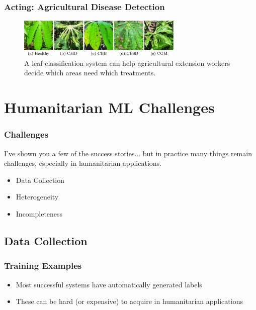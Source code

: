 \documentclass[10pt,mathserif]{beamer}
\begin{document}
\begin{frame}
  \frametitle{Acting: Agricultural Disease Detection}
  \begin{figure}[ht]
    \centering
    \includegraphics[width=0.7\textwidth]{figures/cassava}
    \caption{A leaf classification system can help agricultural extension
      workers decide which areas need which treatments. \label{fig:cassava} }
  \end{figure}

\end{frame}

\section{Humanitarian ML Challenges}
\label{sec:label}

\begin{frame}
  \frametitle{Challenges}

  I've shown you a few of the success stories... but in practice many things
  remain challenges, especially in humanitarian applications.

  \begin{itemize}
  \item Data Collection
  \item Heterogeneity
  \item Incompleteness
  \end{itemize} 
\end{frame}

\subsection{Data Collection}
\label{subsec:label}

\begin{frame}
  \frametitle{Training Examples}
  \begin{itemize}
  \item Most successful systems have automatically generated labels
  \item These can be hard (or expensive) to acquire in humanitarian applications
  \end{itemize} 
\end{frame}
\end{document}
